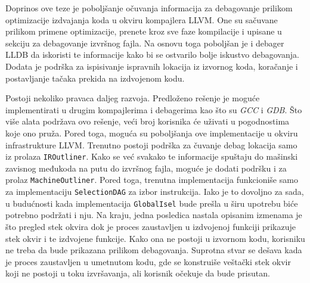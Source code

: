 \documentclass[12pt,oneside]{memoir}
\begin{document}
Doprinos ove teze je poboljšanje očuvanja informacija za debagovanje prilikom optimizacije izdvajanja koda u okviru kompajlera LLVM.
One su sačuvane prilikom primene optimizacije, prenete kroz sve faze kompilacije i upisane u sekciju za debagovanje izvršnog fajla.
Na osnovu toga poboljšan je i debager LLDB da iskoristi te informacije kako bi se ostvarilo bolje iskustvo debagovanja.
Dodata je podrška za ispisivanje ispravnih lokacija iz izvornog koda, koračanje i postavljanje tačaka prekida na izdvojenom kodu.


Postoji nekoliko pravaca daljeg razvoja.
Predloženo rešenje je moguće implementirati u drugim kompajlerima i debagerima kao što su \textit{GCC} i \textit{GDB}.
Što više alata podržava ovo rešenje, veći broj korisnika će uživati u pogodnostima koje ono pruža.
Pored toga, moguća su poboljšanja ove implementacije u okviru infrastrukture LLVM.
Trenutno postoji podrška za čuvanje debag lokacija samo iz prolaza \verb|IROutliner|.
Kako se već svakako te informacije spuštaju do mašinski zavisnog međukoda na putu do izvršnog fajla, moguće je dodati podršku i za prolaz \verb|MachineOutliner|.
Pored toga, trenutna implementacija funkcioniše samo za implementaciju \verb|SelectionDAG| za izbor instrukcija.
Iako je to dovoljno za sada, u budućnosti kada implementacija \verb|GlobalIsel| bude prešla u širu upotrebu biće potrebno podržati i nju.
Na kraju, jedna posledica nastala opisanim izmenama je što pregled stek okvira dok je proces zaustavljen u izdvojenoj funkciji prikazuje stek okvir i te izdvojene funkcije.
Kako ona ne postoji u izvornom kodu, korisniku ne treba da bude prikazana prilikom debagovanja.
Suprotna stvar se dešava kada je proces zaustavljen u umetnutom kodu, gde se konstruiše veštački stek okvir koji ne postoji u toku izvršavanja, ali korisnik očekuje da bude prisutan.
\end{document}

